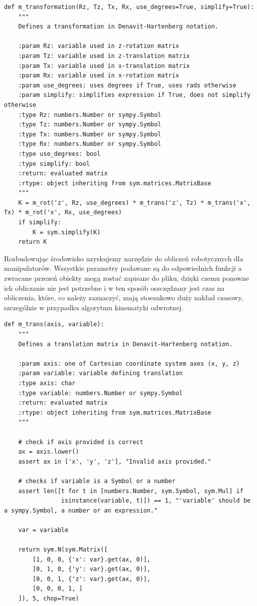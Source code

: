 \documentclass[polish,polish]{article}
\begin{document}
\begin{lstlisting}[style = Python,
     caption={Funkcja obliczająca macierz transformacji},
     label={lst:transformation}
   ]
def m_transformation(Rz, Tz, Tx, Rx, use_degrees=True, simplify=True):
    """
    Defines a transformation in Denavit-Hartenberg notation.

    :param Rz: variable used in z-rotation matrix
    :param Tz: variable used in z-translation matrix
    :param Tx: variable used in x-translation matrix
    :param Rx: variable used in x-rotation matrix
    :param use_degrees: uses degrees if True, uses rads otherwise
    :param simplify: simplifies expression if True, does not simplify otherwise
    :type Rz: numbers.Number or sympy.Symbol
    :type Tz: numbers.Number or sympy.Symbol
    :type Tx: numbers.Number or sympy.Symbol
    :type Rx: numbers.Number or sympy.Symbol
    :type use_degrees: bool
    :type simplify: bool
    :return: evaluated matrix
    :rtype: object inheriting from sym.matrices.MatrixBase
    """
    K = m_rot('z', Rz, use_degrees) * m_trans('z', Tz) * m_trans('x', Tx) * m_rot('x', Rx, use_degrees)
    if simplify:
        K = sym.simplify(K)
    return K
\end{lstlisting}

Rozbudowując środowisko uzyskujemy narzędzie do obliczeń robotycznych dla manipulatorów. 
Wszystkie parametry podawane są do odpowiednich funkcji a zwracane przezeń obiekty mogą zostać zapisane do pliku, dzięki czemu ponowne ich obliczanie nie jest potrzebne i w ten sposób oszczędzany jest czas na obliczenia, które, co należy zaznaczyć, mają stosunkowo duży nakład czasowy, szczególnie w przypadku algorytmu kinematyki odwrotnej.

\newpage
\begin{lstlisting}[style = Python,
     caption={Funkcja obliczająca macierz translacji},
     label={lst:translation}
   ]
def m_trans(axis, variable):
    """
    Defines a translation matrix in Denavit-Hartenberg notation.

    :param axis: one of Cartesian coordinate system axes (x, y, z)
    :param variable: variable defining translation
    :type axis: char
    :type variable: numbers.Number or sympy.Symbol
    :return: evaluated matrix
    :rtype: object inheriting from sym.matrices.MatrixBase
    """

    # check if axis provided is correct
    ax = axis.lower()
    assert ax in ['x', 'y', 'z'], "Invalid axis provided."

    # checks if variable is a Symbol or a number
    assert len([t for t in [numbers.Number, sym.Symbol, sym.Mul] if
                isinstance(variable, t)]) == 1, "'variable' should be a sympy.Symbol, a number or an expression."

    var = variable

    return sym.N(sym.Matrix([
        [1, 0, 0, {'x': var}.get(ax, 0)],
        [0, 1, 0, {'y': var}.get(ax, 0)],
        [0, 0, 1, {'z': var}.get(ax, 0)],
        [0, 0, 0, 1, ]
    ]), 5, chop=True)
\end{lstlisting}
\end{document}
